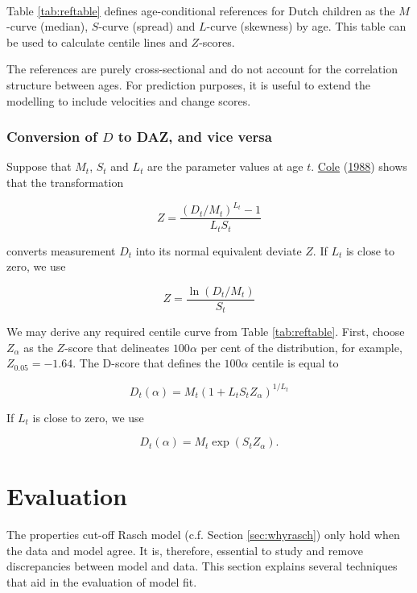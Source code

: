 \documentclass[
]{book}
\begin{document}
~

Table \ref{tab:reftable} defines age-conditional references for Dutch children as the \(M\)-curve (median), \(S\)-curve (spread) and \(L\)-curve (skewness) by age. This table can be used to calculate centile lines and \(Z\)-scores.

The references are purely cross-sectional and do not account for the correlation structure between ages. For prediction purposes, it is useful to extend the modelling to include velocities and change scores.

\hypertarget{conversion-of-d-to-daz-and-vice-versa}{%
\subsection{\texorpdfstring{Conversion of \(D\) to DAZ, and vice versa}{Conversion of D to DAZ, and vice versa}}\label{conversion-of-d-to-daz-and-vice-versa}}

Suppose that \(M_t\), \(S_t\) and \(L_t\) are the parameter values at age \(t\). \protect\hyperlink{ref-cole1988}{Cole} (\protect\hyperlink{ref-cole1988}{1988}) shows that the transformation

\[Z=\frac{(D_t/M_t)^{L_t}-1}{L_t S_t}\]

converts measurement \(D_t\) into its normal equivalent deviate \(Z\). If \(L_t\) is close to zero, we use

\[Z=\frac{\ln(D_t/M_t)}{S_t}\]

We may derive any required centile curve from Table \ref{tab:reftable}. First, choose \(Z_\alpha\) as the \(Z\)-score that delineates \(100\alpha\) per cent of the distribution, for example, ~\(Z_{0.05}=-1.64\). The D-score that defines the \(100\alpha\) centile is equal to

\[D_t(\alpha) = M_t (1+L_t S_t Z_\alpha)^{1/L_t}\]

If \(L_t\) is close to zero, we use

\[D_t(\alpha)= M_t \exp(S_t Z_\alpha).\]

\hypertarget{ch:evaluation}{%
\chapter{Evaluation}\label{ch:evaluation}}

The properties cut-off Rasch model (c.f. Section \ref{sec:whyrasch}) only hold when the data and model agree. It is, therefore, essential to study and remove discrepancies between model and data. This section explains several techniques that aid in the evaluation of model fit.
\end{document}
